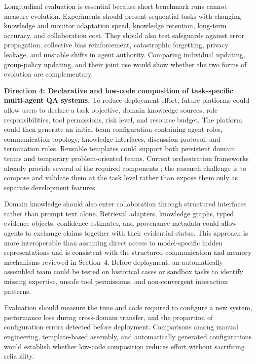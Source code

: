 Longitudinal evaluation is essential because short benchmark runs cannot
measure evolution. Experiments should present sequential tasks with changing
knowledge and monitor adaptation speed, knowledge retention, long-term
accuracy, and collaboration cost. They should also test safeguards against
error propagation, collective bias reinforcement, catastrophic forgetting,
privacy leakage, and unstable shifts in agent authority. Comparing individual
updating, group-policy updating, and their joint use would show whether the
two forms of evolution are complementary.

\textbf{Direction 4: Declarative and low-code composition of task-specific
multi-agent QA systems.}
To reduce deployment effort, future platforms could allow users to declare a
task objective, domain knowledge sources, role responsibilities, tool
permissions, risk level, and resource budget. The platform could then generate
an initial team configuration containing agent roles, communication topology,
knowledge interfaces, discussion protocol, and termination rules. Reusable
templates could support both persistent domain teams and temporary
problem-oriented teams. Current orchestration frameworks already provide
several of the required components \citep{wu2024autogen,langgraph2024,
crewai2023,dify2024}; the research challenge is to compose and validate them
at the task level rather than expose them only as separate development
features.

Domain knowledge should also enter collaboration through structured
interfaces rather than prompt text alone. Retrieval adapters, knowledge
graphs, typed evidence objects, confidence estimates, and provenance metadata
could allow agents to exchange claims together with their evidential status.
This approach is more interoperable than assuming direct access to
model-specific hidden representations and is consistent with the structured
communication and memory mechanisms reviewed in Section~4. Before deployment,
an automatically assembled team could be tested on historical cases or
sandbox tasks to identify missing expertise, unsafe tool permissions, and
non-convergent interaction patterns.

Evaluation should measure the time and code required to configure a new
system, performance loss during cross-domain transfer, and the proportion of
configuration errors detected before deployment. Comparisons among manual
engineering, template-based assembly, and automatically generated
configurations would establish whether low-code composition reduces effort
without sacrificing reliability.

